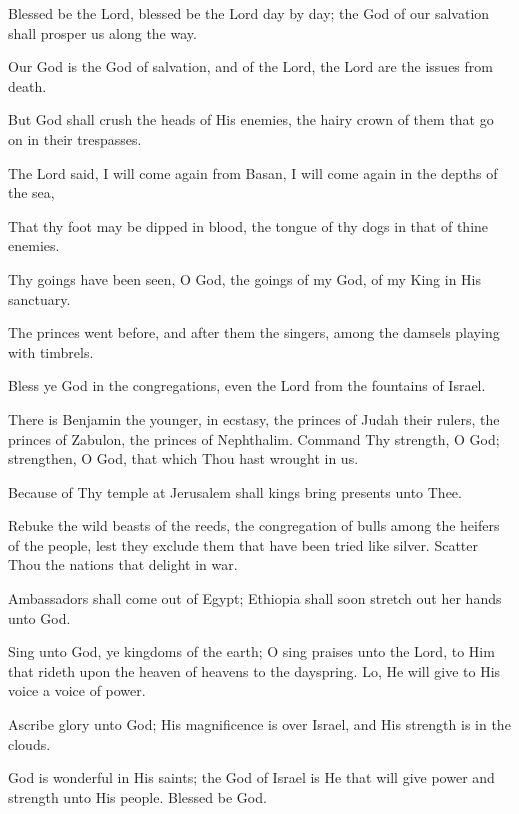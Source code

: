 Blessed be the Lord, blessed be the Lord day by day; the God of our salvation shall prosper us along the way.

Our God is the God of salvation, and of the Lord, the Lord are the issues from death.

But God shall crush the heads of His enemies, the hairy crown of them that go on in their trespasses.

The Lord said, I will come again from Basan, I will come again in the depths of the sea,

That thy foot may be dipped in blood, the tongue of thy dogs in that of thine enemies.

Thy goings have been seen, O God, the goings of my God, of my King in His sanctuary.

The princes went before, and after them the singers, among the damsels playing with timbrels.

Bless ye God in the congregations, even the Lord from the fountains of Israel.

There is Benjamin the younger, in ecstasy, the princes of Judah their rulers, the princes of Zabulon, the princes of Nephthalim. Command Thy strength, O God; strengthen, O God, that which Thou hast wrought in us.

Because of Thy temple at Jerusalem shall kings bring presents unto Thee.

Rebuke the wild beasts of the reeds, the congregation of bulls among the heifers of the people, lest they exclude them that have been tried like silver. Scatter Thou the nations that delight in war.

Ambassadors shall come out of Egypt; Ethiopia shall soon stretch out her hands unto God.

Sing unto God, ye kingdoms of the earth; O sing praises unto the Lord, to Him that rideth upon the heaven of heavens to the dayspring. Lo, He will give to His voice a voice of power.

Ascribe glory unto God; His magnificence is over Israel, and His strength is in the clouds.

God is wonderful in His saints; the God of Israel is He that will give power and strength unto His people. Blessed be God.
